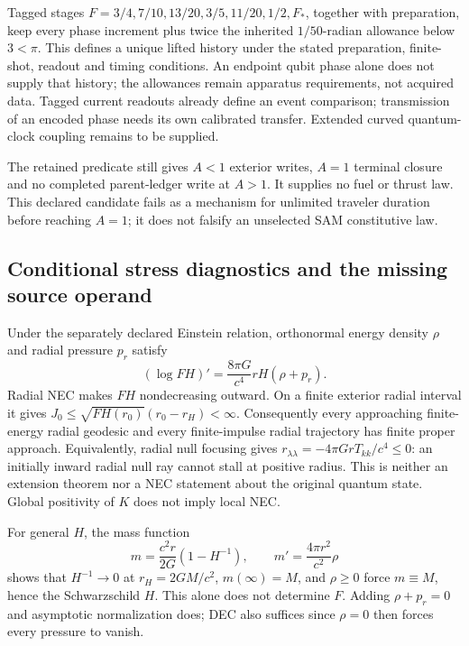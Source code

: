 \documentclass[10pt,twocolumn,letterpaper]{article}
\begin{document}
Tagged stages $F=3/4,7/10,13/20,3/5,11/20,1/2,F_*$, together with
preparation, keep every phase increment plus twice the inherited
$1/50$-radian allowance below $3<\pi$. This defines a unique lifted
history under the stated preparation, finite-shot, readout and timing
conditions. An endpoint qubit phase alone does not supply that history;
the allowances remain apparatus requirements, not acquired data.
Tagged current readouts already define an event comparison; transmission
of an encoded phase needs its own calibrated transfer. Extended curved
quantum-clock coupling remains to be supplied.

The retained predicate still gives $A<1$ exterior writes, $A=1$ terminal
closure and no completed parent-ledger write at $A>1$. It supplies no
fuel or thrust law. This declared candidate fails as a mechanism for
unlimited traveler duration before reaching $A=1$; it does not falsify
an unselected SAM constitutive law.

\subsection{Conditional stress diagnostics and the missing source operand}
Under the separately declared Einstein relation, orthonormal energy
density $\rho$ and radial pressure $p_r$ satisfy
\begin{equation}
 (\log FH)'=\frac{8\pi G}{c^4}rH(\rho+p_r).
\end{equation}
Radial NEC makes $FH$ nondecreasing outward. On a finite exterior radial
interval it gives
$J_0\le\sqrt{FH(r_0)}(r_0-r_H)<\infty$.
Consequently every approaching finite-energy radial geodesic and every
finite-impulse radial trajectory has finite proper approach. Equivalently,
radial null focusing gives $r_{\lambda\lambda}=-4\pi GrT_{kk}/c^4\le0$:
an initially inward radial null ray cannot stall at positive radius.
This is neither an extension theorem nor a NEC statement about the
original quantum state. Global positivity of $K$ does not imply local NEC.

For general $H$, the mass function
\begin{equation}
 m=\frac{c^2r}{2G}(1-H^{-1}),\qquad
 m'=\frac{4\pi r^2}{c^2}\rho
\end{equation}
shows that $H^{-1}\to0$ at $r_H=2GM/c^2$, $m(\infty)=M$, and
$\rho\ge0$ force $m\equiv M$, hence the Schwarzschild $H$. This alone
does not determine $F$. Adding $\rho+p_r=0$ and asymptotic normalization
does; DEC also suffices since $\rho=0$ then forces every pressure to vanish.
\end{document}
